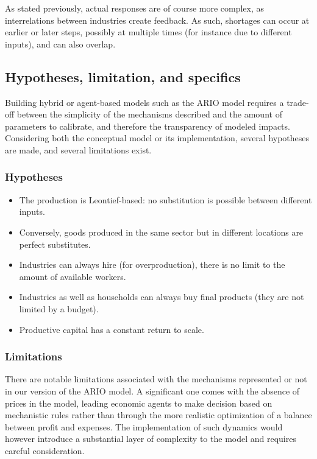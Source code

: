 \documentclass[main.tex]{subfiles}
\begin{document}
As stated previously, actual responses are of course more complex, as
interrelations between industries create feedback. As such, shortages can occur
at earlier or later steps, possibly at multiple times (for instance due to
different inputs), and can also overlap.

\subsection{Hypotheses, limitation, and specifics}
\label{sec:hypotheses-lim-spec}

Building hybrid or agent-based models such as the ARIO model requires a trade-off between
the simplicity of the mechanisms described and the amount of parameters
to calibrate, and therefore the transparency of modeled impacts. Considering
both the conceptual model or its implementation, several hypotheses
are made, and several limitations exist.

\subsubsection{Hypotheses}
\label{sec:hypotheses}

\begin{itemize}
\item The production is Leontief-based: no substitution is possible between different
  inputs.
\item Conversely, goods produced in the same sector but in different locations are perfect
  substitutes.
\item Industries can always hire (for overproduction), there is no limit to the
  amount of available workers.
\item Industries as well as households can always buy final products (they are
  not limited by a budget).
\item Productive capital has a constant return to scale.
\end{itemize}

\subsubsection{Limitations}
\label{sec:limitations}

There are notable limitations associated with the mechanisms represented or not
in our version of the ARIO model. A significant one comes with the absence of
prices in the model, leading economic agents to make decision based on
mechanistic rules rather than through the more realistic optimization of a
balance between profit and expenses. The implementation of such dynamics would
however introduce a substantial layer of complexity to the model and requires
careful consideration.
\end{document}
